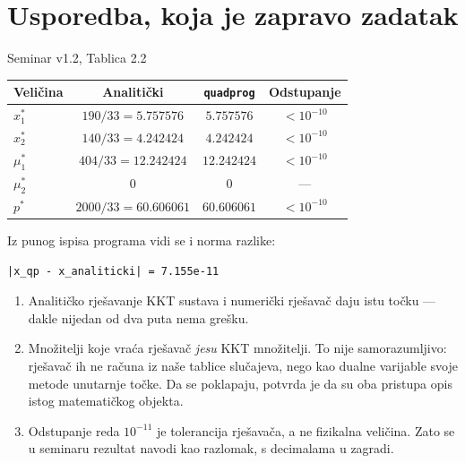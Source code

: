 \section{Usporedba, koja je zapravo zadatak}
\label{sec:z1d-usporedba}

\begin{seminar}{Seminar v1.2, Tablica 2.2}
\begin{center}
\begin{tabular}{lccc}
\toprule
\textbf{Veličina} & \textbf{Analitički} & \texttt{quadprog} & \textbf{Odstupanje} \\
\midrule
$x_1^*$   & $190/33 = 5.757576$  & $5.757576$  & $< 10^{-10}$ \\
$x_2^*$   & $140/33 = 4.242424$  & $4.242424$  & $< 10^{-10}$ \\
$\mu_1^*$ & $404/33 = 12.242424$ & $12.242424$ & $< 10^{-10}$ \\
$\mu_2^*$ & $0$                  & $0$         & --- \\
$p^*$     & $2000/33 = 60.606061$& $60.606061$ & $< 10^{-10}$ \\
\bottomrule
\end{tabular}
\end{center}
\end{seminar}

Iz punog ispisa programa vidi se i norma razlike:

\begin{lstlisting}[style=outputstyle]
|x_qp - x_analiticki| = 7.155e-11
\end{lstlisting}

\begin{korak}
\begin{enumerate}[leftmargin=*]
  \item Analitičko rješavanje KKT sustava i numerički rješavač daju istu točku ---
        dakle nijedan od dva puta nema grešku.
  \item Množitelji koje vraća rješavač \emph{jesu} KKT množitelji. To nije
        samorazumljivo: rješavač ih ne računa iz naše tablice slučajeva, nego kao
        dualne varijable svoje metode unutarnje točke. Da se poklapaju, potvrda
        je da su oba pristupa opis istog matematičkog objekta.
  \item Odstupanje reda $10^{-11}$ je tolerancija rješavača, a ne fizikalna
        veličina. Zato se u seminaru rezultat navodi kao razlomak, s decimalama
        u zagradi.
\end{enumerate}
\end{korak}

